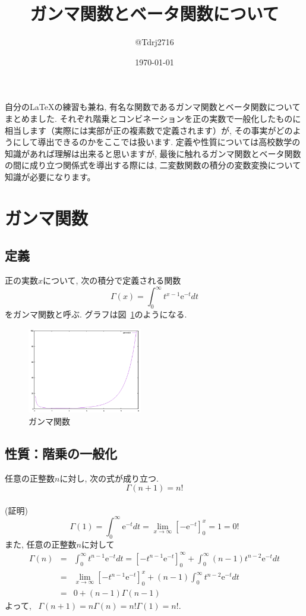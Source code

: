 \documentclass[a4paper,12pt,uplatex,dvipdfmx]{jsarticle}
\begin{document}
\title{ガンマ関数とベータ関数について}
\author{@Tdrj2716}
\date{\today}
\maketitle

自分の\LaTeX の練習も兼ね, 有名な関数であるガンマ関数とベータ関数についてまとめました. それぞれ階乗とコンビネーションを正の実数で一般化したものに相当します（実際には実部が正の複素数で定義されます）が, その事実がどのようにして導出できるのかをここでは扱います. 定義や性質については高校数学の知識があれば理解は出来ると思いますが, 最後に触れるガンマ関数とベータ関数の間に成り立つ関係式を導出する際には, 二変数関数の積分の変数変換について知識が必要になります。

\section{ガンマ関数}
\subsection{定義}
正の実数$x$について, 次の積分で定義される関数
\[
  \Gamma(x) = \int_0^\infty t^{x-1}\mathrm{e}^{-t} dt
\]
をガンマ関数と呼ぶ. グラフは図~\ref{fig:gamma}のようになる.
\begin{figure}
    \begin{center}
        \includegraphics[clip, width=5cm]{gamma.png}
        \caption{ガンマ関数}
        \label{fig:gamma}
    \end{center}
\end{figure}

\subsection{性質：階乗の一般化}
任意の正整数$n$に対し, 次の式が成り立つ.
\[
    \Gamma(n+1) = n!
\] \\
(証明)
\[
    \Gamma(1) = \int_0^\infty \mathrm{e}^{-t} dt = \lim_{x \to \infty} [-\mathrm{e}^{-t}]_0^x = 1 = 0!
\]
また, 任意の正整数$n$に対して 
\begin{eqnarray*}
    \Gamma(n) & = & \int_0^\infty t^{n-1}\mathrm{e}^{-t} dt = [-t^{n-1}\mathrm{e}^{-t}]_0^{\infty} + \int_0^\infty (n-1)t^{n-2}\mathrm{e}^{-t} dt \\
    & = & \lim_{x \to \infty}[-t^{n-1}\mathrm{e}^{-t}]_0^x + (n-1)\int_0^\infty t^{n-2}\mathrm{e}^{-t} dt \\
    & = & 0 + (n-1)\Gamma(n-1) 
\end{eqnarray*}
よって, ~$\Gamma(n+1) = n\Gamma(n) = n!\Gamma(1) = n!$. \\
\end{document}
